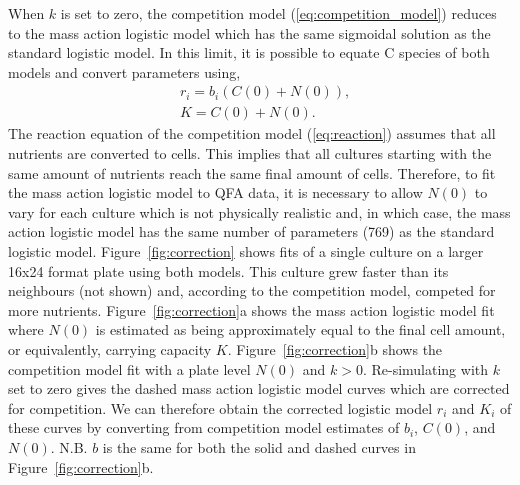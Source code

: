When \(k\) is set to zero, the competition model
(\ref{eq:competition_model}) reduces to the mass action logistic model
which has the same sigmoidal solution as the standard logistic
model. In this limit, it is possible to equate C species of both
models and convert parameters using,
\begin{subequations}
  \label{eq:conversion}
  \begin{align}
    &r_{i} = b_{i}(C(0) + N(0)),\\
    &K = C(0) + N(0).
  \end{align}
\end{subequations}
%
The reaction equation of the competition model (\ref{eq:reaction})
assumes that all nutrients are converted to cells. This implies that
all cultures starting with the same amount of nutrients reach the same
final amount of cells. Therefore, to fit the mass action logistic
model to QFA data, it is necessary to allow \(N(0)\) to vary for each
culture which is not physically realistic and, in which case, the mass
action logistic model has the same number of parameters (769) as the
standard logistic model.
%
Figure~\ref{fig:correction} shows fits of a single culture on a larger
16x24 format plate using both models. This culture grew faster than
its neighbours (not shown) and, according to the competition model,
competed for more nutrients.
%
Figure~\ref{fig:correction}a shows the mass action logistic model fit
where \(N(0)\) is estimated as being approximately equal to the final
cell amount, or equivalently, carrying capacity \(K\).
%
Figure~\ref{fig:correction}b shows the competition model fit with a
plate level \(N(0)\) and \(k > 0\). Re-simulating with \(k\)
set to zero gives the dashed mass action logistic model curves which
are corrected for competition. We can therefore obtain the corrected
logistic model \(r_{i}\) and \(K_{i}\) of these curves by converting
from competition model estimates of \(b_{i}\), \(C(0)\), and
\(N(0)\). N.B. \(b\) is the same for both the solid and dashed
curves in Figure~\ref{fig:correction}b.

%

